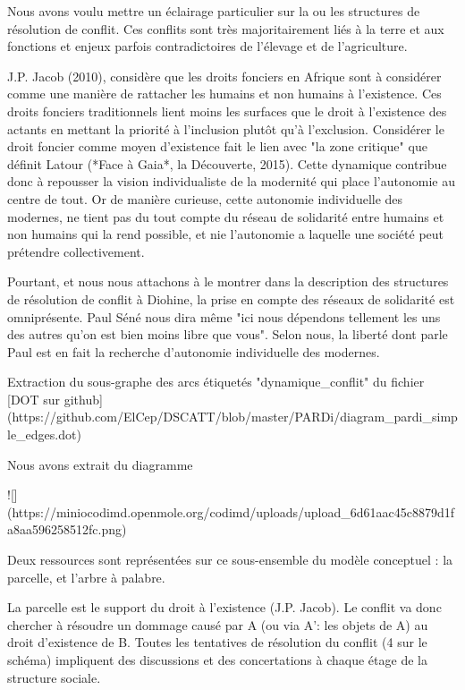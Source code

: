 Nous avons voulu mettre un éclairage particulier sur la ou les structures de résolution de conflit. Ces conflits sont très majoritairement liés à la terre et aux fonctions et enjeux parfois contradictoires de l'élevage et de l'agriculture. 

J.P. Jacob (2010), considère que les droits fonciers en Afrique sont à considérer comme une manière de rattacher les humains et non humains à l'existence. Ces droits fonciers traditionnels lient moins les surfaces que le droit à l'existence des actants en mettant la priorité à l'inclusion plutôt qu'à l'exclusion. Considérer le droit foncier comme moyen d'existence fait le lien avec "la zone critique" que définit Latour (*Face à Gaia*, la Découverte, 2015). Cette dynamique contribue donc à repousser la vision individualiste de la modernité qui place l'autonomie au centre de tout. Or de manière curieuse, cette autonomie individuelle des modernes, ne tient pas du tout compte du réseau de solidarité entre humains et non humains qui la rend possible, et nie l'autonomie a laquelle une société peut prétendre collectivement. 

Pourtant, et nous nous  attachons à le montrer dans la description des structures de résolution de conflit à Diohine, la prise en compte des réseaux de solidarité est omniprésente. Paul Séné nous dira même "ici nous dépendons tellement les uns des autres qu'on est bien moins libre que vous". Selon nous, la liberté dont parle Paul est en fait la recherche d'autonomie individuelle des modernes.

Extraction du sous-graphe des arcs étiquetés  "dynamique_conflit" du fichier [DOT sur github](https://github.com/ElCep/DSCATT/blob/master/PARDi/diagram_pardi_simple_edges.dot)

Nous avons extrait du diagramme 

![](https://miniocodimd.openmole.org/codimd/uploads/upload_6d61aac45c8879d1fa8aa596258512fc.png)

Deux ressources sont représentées sur ce sous-ensemble du modèle conceptuel : la parcelle, et l'arbre à palabre. 

La parcelle est le support du droit à l'existence (J.P. Jacob). Le conflit va donc chercher à résoudre un dommage causé par A (ou via A': les objets de A) au droit d'existence de B. Toutes les tentatives de résolution du conflit (4 sur le schéma) impliquent des discussions et des concertations à chaque étage de la structure sociale.


